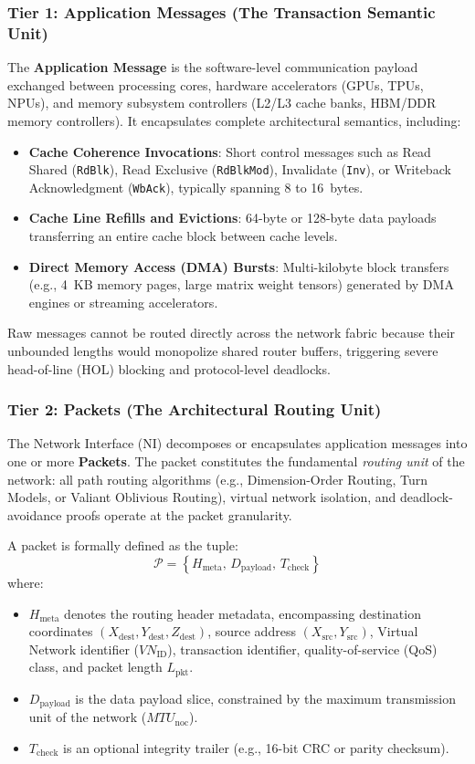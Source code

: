 \subsubsection{Tier 1: Application Messages (The Transaction Semantic Unit)}
The \textbf{Application Message} is the software-level communication payload exchanged between processing cores, hardware accelerators (GPUs, TPUs, NPUs), and memory subsystem controllers (L2/L3 cache banks, HBM/DDR memory controllers). It encapsulates complete architectural semantics, including:
\begin{itemize}
    \item \textbf{Cache Coherence Invocations}: Short control messages such as Read Shared (\texttt{RdBlk}), Read Exclusive (\texttt{RdBlkMod}), Invalidate (\texttt{Inv}), or Writeback Acknowledgment (\texttt{WbAck}), typically spanning 8 to 16~bytes.
    \item \textbf{Cache Line Refills and Evictions}: 64-byte or 128-byte data payloads transferring an entire cache block between cache levels.
    \item \textbf{Direct Memory Access (DMA) Bursts}: Multi-kilobyte block transfers (e.g., 4~KB memory pages, large matrix weight tensors) generated by DMA engines or streaming accelerators.
\end{itemize}
Raw messages cannot be routed directly across the network fabric because their unbounded lengths would monopolize shared router buffers, triggering severe head-of-line (HOL) blocking and protocol-level deadlocks.

\subsubsection{Tier 2: Packets (The Architectural Routing Unit)}
The Network Interface (NI) decomposes or encapsulates application messages into one or more \textbf{Packets}. The packet constitutes the fundamental \emph{routing unit} of the network: all path routing algorithms (e.g., Dimension-Order Routing, Turn Models, or Valiant Oblivious Routing), virtual network isolation, and deadlock-avoidance proofs operate at the packet granularity.

A packet is formally defined as the tuple:
\begin{equation}
\mathcal{P} = \left\{ H_{\text{meta}},\, D_{\text{payload}},\, T_{\text{check}} \right\}
\label{eq:ch2_packet_tuple}
\end{equation}
where:
\begin{itemize}
    \item $H_{\text{meta}}$ denotes the routing header metadata, encompassing destination coordinates $(X_{\text{dest}}, Y_{\text{dest}}, Z_{\text{dest}})$, source address $(X_{\text{src}}, Y_{\text{src}})$, Virtual Network identifier ($VN_{\text{ID}}$), transaction identifier, quality-of-service (QoS) class, and packet length $L_{\text{pkt}}$.
    \item $D_{\text{payload}}$ is the data payload slice, constrained by the maximum transmission unit of the network ($MTU_{\text{noc}}$).
    \item $T_{\text{check}}$ is an optional integrity trailer (e.g., 16-bit CRC or parity checksum).
\end{itemize}

